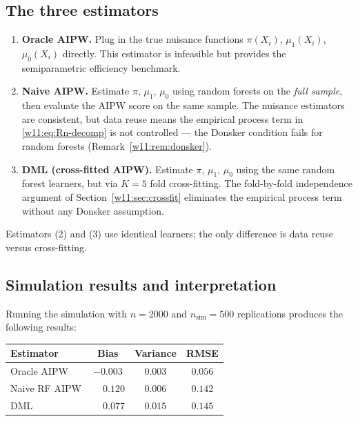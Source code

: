 \documentclass[master.tex]{subfiles}
\begin{document}
\subsection{The three estimators}
\label{w11:subsec:lab-estimators}

\begin{enumerate}
  \item \textbf{Oracle AIPW.}  Plug in the true nuisance functions
    $\pi(X_i)$, $\mu_1(X_i)$, $\mu_0(X_i)$ directly.  This
    estimator is infeasible but provides the semiparametric
    efficiency benchmark.
  \item \textbf{Naive AIPW.}  Estimate $\pi$, $\mu_1$, $\mu_0$
    using random forests on the \emph{full sample}, then evaluate
    the AIPW score on the same sample.  The nuisance estimators are
    consistent, but data reuse means the empirical process term in
    \eqref{w11:eq:Rn-decomp} is not controlled — the Donsker
    condition fails for random forests
    (Remark~\ref{w11:rem:donsker}).
  \item \textbf{DML (cross-fitted AIPW).}  Estimate $\pi$, $\mu_1$,
    $\mu_0$ using the same random forest learners, but via $K = 5$
    fold cross-fitting.  The fold-by-fold independence argument of
    Section~\ref{w11:sec:crossfit} eliminates the empirical process
    term without any Donsker assumption.
\end{enumerate}

Estimators (2) and (3) use identical learners; the only difference
is data reuse versus cross-fitting.

\subsection{Simulation results and interpretation}
\label{w11:subsec:lab-results}

Running the simulation with $n = 2000$ and $n_{\mathrm{sim}} = 500$
replications produces the following results:

\medskip
\begin{center}
\renewcommand{\arraystretch}{1.3}
\begin{tabular}{lccc}
\hline
\textbf{Estimator} & \textbf{Bias} & \textbf{Variance} & \textbf{RMSE} \\
\hline
Oracle AIPW   & $-0.003$ & $0.003$ & $0.056$ \\
Naive RF AIPW & $\phantom{-}0.120$ & $0.006$ & $0.142$ \\
DML           & $\phantom{-}0.077$ & $0.015$ & $0.145$ \\
\hline
\end{tabular}
\end{center}
\medskip
\end{document}
